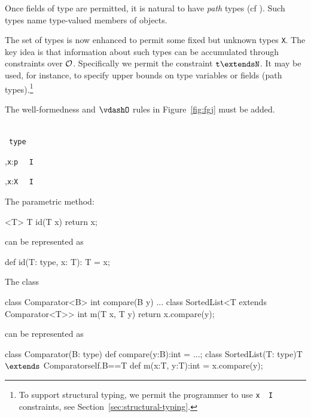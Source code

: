 Once fields of type \type{} are permitted, it is natural to have {\em
path} types (cf \cite{scala}). Such types name type-valued members of
objects.

The set of types is now enhanced to permit some fixed but unknown
types {\tt X}. The key idea is that information about such types can
be accumulated through constraints over $\cal O$.  Specifically we
permit the constraint ${\tt t \extends N}$. It may be used, for
instance, to specify upper bounds on type variables or fields (path
types).\footnote{To support structural typing, we permit the
programmer to use {\tt x\ \has\ I} constraints, see
Section~\ref{sec:structural-typing}.}

The well-formedness and $\vdashO$ rules in
Figure~\ref{fig:fgj} must be added.

\begin{figure*}
\quad\\[-12pt]
	{\Gamma {}\ {\tt type}} 



	{\Gamma,{\tt x}:{\tt p} \ \has\ {\tt I}}

	{\Gamma,{\tt x}:{\tt X} \ \has\ {\tt I}}
\caption{\FXG{} semantics}
\label{fig:fgj}
\end{figure*}

\begin{example}
The \FGJ{} parametric method:

{\footnotesize
\begin{xten} 
 <T> T id(T x) { return x; }
\end{xten}
}
\noindent can be represented as
{\footnotesize
\begin{xten} 
def id(T: type, x: T): T = x;
\end{xten}
}

\noindent The \FGJ{} class 
{\footnotesize
\begin{xten} 
class Comparator<B> {
  int compare(B y) { ... } }
class SortedList<T extends Comparator<T>> { 
  int m(T x, T y) {
     return x.compare(y); } }
\end{xten}
}
\noindent can be represented as
{\footnotesize
\begin{xtenmath} 
class Comparator(B: type) {
 def compare(y:B):int = ...;
}
class SortedList(T: type){T $\extends$ Comparator{self.B==T}} { 
  def m(x:T, y:T):int = x.compare(y);
}
\end{xtenmath}
}
\end{example}

